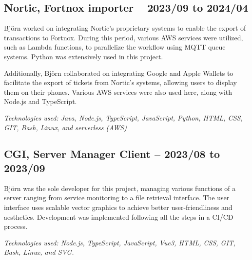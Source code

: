 \subsection*{\textcolor{colorTitelErfarenhet}{Nortic, Fortnox importer – 2023/09 to 2024/04}}
Björn worked on integrating Nortic's proprietary systems to enable the export of transactions to Fortnox. During this period, various AWS services were utilized, such as Lambda functions, to parallelize the workflow using MQTT queue systems. Python was extensively used in this project.

Additionally, Björn collaborated on integrating Google and Apple Wallets to facilitate the export of tickets from Nortic's systems, allowing users to display them on their phones. Various AWS services were also used here, along with Node.js and TypeScript.

\vspace{5pt}\textit{Technologies used: Java, Node.js, TypeScript, JavaScript, Python, HTML, CSS, GIT, Bash, Linux, and serverless (AWS)}

\vspace{15pt} %
\subsection*{\textcolor{colorTitelErfarenhet}{CGI, Server Manager Client – 2023/08 to 2023/09}}
Björn was the sole developer for this project, managing various functions of a server ranging from service monitoring to a file retrieval interface. The user interface uses scalable vector graphics to achieve better user-friendliness and aesthetics. Development was implemented following all the steps in a CI/CD process.

\vspace{5pt}\textit{Technologies used: Node.js, TypeScript, JavaScript, Vue3, HTML, CSS, GIT, Bash, Linux, and SVG.}
